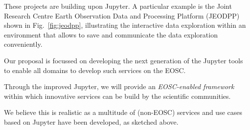 These projects are building upon Jupyter. A particular example is the
Joint Research Centre Earth Observation Data and Processing Platform
(JEODPP) shown in Fig.~\ref{fig:jeodpp}, illustrating the interactive
data exploration within an environment that allows to save and
communicate the data exploration conveniently.
\bigskip

Our \TheProject proposal is focussed on developing the next generation
of the Jupyter tools to enable all domains to develop such services on
the EOSC.

Through the \TheProject improved Jupyter, we will provide an \emph{EOSC-enabled
framework} within which innovative services can be build by the
scientific communities.

We believe this is realistic as a multitude of (non-EOSC) services and
use cases based on Jupyter have been developed, as sketched above.

